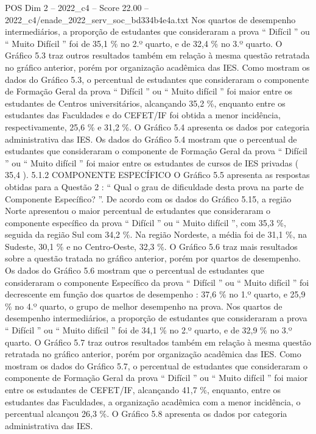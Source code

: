 \begin{textsample}{POS Dim 2 – 2022\_c4 – Score 22.00 – 2022\_c4/enade\_2022\_serv\_soc\_bd334b4e4a.txt}
Nos quartos de desempenho intermediários, a proporção de estudantes que consideraram a prova “ Difícil ” ou “ Muito Difícil ” foi de 35,1 \% no 2.º quarto, e de 32,4 \% no 3.º quarto.
O Gráfico 5.3 traz outros resultados também em relação à mesma questão retratada no gráfico anterior, porém por organização acadêmica das IES.
Como mostram os dados do Gráfico 5.3, o percentual de estudantes que consideraram o componente de Formação Geral da prova “ Difícil ” ou “ Muito difícil ” foi maior entre os estudantes de Centros universitários, alcançando 35,2 \%, enquanto entre os estudantes das Faculdades e do CEFET/IF foi obtida a menor incidência, respectivamente, 25,6 \% e 31,2 \%.
O Gráfico 5.4 apresenta os dados por categoria administrativa das IES.
Os dados do Gráfico 5.4 mostram que o percentual de estudantes que consideraram o componente de Formação Geral da prova “ Difícil ” ou “ Muito difícil ” foi maior entre os estudantes de cursos de IES privadas ( 35,4 ). 5.1.2 COMPONENTE ESPECÍFICO O Gráfico 5.5 apresenta as respostas obtidas para a Questão 2 : “ Qual o grau de dificuldade desta prova na parte de Componente Específico? ”.
De acordo com os dados do Gráfico 5.15, a região Norte apresentou o maior percentual de estudantes que consideraram o componente específico da prova “ Difícil ” ou “ Muito difícil ”, com 35,3 \%, seguida da região Sul com 34,2 \%.
Na região Nordeste, a média foi de 31,1 \%, na Sudeste, 30,1 \% e no Centro-Oeste, 32,3 \%.
O Gráfico 5.6 traz mais resultados sobre a questão tratada no gráfico anterior, porém por quartos de desempenho.
Os dados do Gráfico 5.6 mostram que o percentual de estudantes que consideraram o componente Específico da prova “ Difícil ” ou “ Muito difícil ” foi decrescente em função dos quartos de desempenho : 37,6 \% no 1.º quarto, e 25,9 \% no 4.º quarto, o grupo de melhor desempenho na prova.
Nos quartos de desempenho intermediários, a proporção de estudantes que consideraram a prova “ Difícil ” ou “ Muito difícil ” foi de 34,1 \% no 2.º quarto, e de 32,9 \% no 3.º quarto.
O Gráfico 5.7 traz outros resultados também em relação à mesma questão retratada no gráfico anterior, porém por organização acadêmica das IES.
Como mostram os dados do Gráfico 5.7, o percentual de estudantes que consideraram o componente de Formação Geral da prova “ Difícil ” ou “ Muito difícil ” foi maior entre os estudantes de CEFET/IF, alcançando 41,7 \%, enquanto, entre os estudantes das Faculdades, a organização acadêmica com a menor incidência, o percentual alcançou 26,3 \%.
O Gráfico 5.8 apresenta os dados por categoria administrativa das IES.

\end{textsample}
